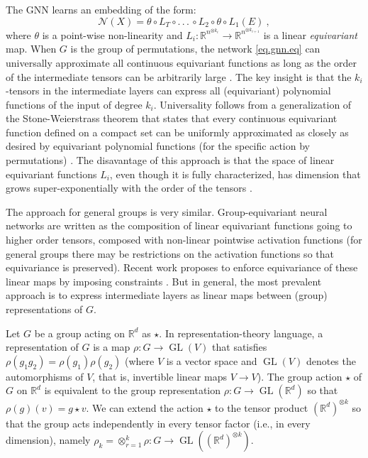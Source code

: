 \documentclass{article}
\theoremstyle{Hogg}
\renewcommand{\ldots}{.\,.\,}
\begin{document}
The GNN learns an embedding of the form:
\begin{equation}
    \label{eq.gnn.eq}
\mathcal{N}(  X)= \theta \circ   L_T \circ \ldots.\, \circ   L_2 \circ \theta \circ   L_1 (  E)~,
\end{equation}
where $\theta$ is a point-wise non-linearity and $  L_i: \mathbb R^{n^{\otimes k_i}}\to \mathbb R^{n^{\otimes k_{i+1}}}$ is a linear \emph{equivariant} map.
When $G$ is the group of permutations, the network \eqref{eq.gnn.eq} can universally approximate all continuous equivariant functions as long as the order of the intermediate tensors can be arbitrarily large \cite{maron2019universality, keriven2019universal}. The key insight is that the $k_i$-tensors in the intermediate layers can express all (equivariant) polynomial functions of the input of degree $k_i$.
Universality follows from a generalization of the Stone-Weierstrass theorem that states that every continuous equivariant function defined on a compact set can be uniformly approximated as closely as desired by equivariant polynomial functions (for the specific action by permutations) \cite{keriven2019universal, azizian2020characterizing}.
The disavantage of this approach is that the space of linear equivariant functions $  L_i$, even though it is fully characterized, has dimension that grows super-exponentially with the order of the tensors \cite{maron2018invariant}. 

The approach for general groups is very similar.
Group-equivariant neural networks are written as the composition of linear equivariant functions going to higher order tensors, composed with non-linear pointwise activation functions (for general groups there may be restrictions on the activation functions so that equivariance is preserved).
Recent work proposes to enforce equivariance of these linear maps by imposing constraints \cite{finzi2021practical}.
But in general, the most prevalent approach is to express
intermediate layers as linear maps between (group) representations of $G$. 

Let $G$ be a group acting on $\mathbb R^d$ as $\star$.
In representation-theory language, a representation of $G$ is a map $\rho: G\to \operatorname{GL}(V)$  that satisfies $\rho(g_1g_2)=\rho(g_1)\rho(g_2)$ (where $V$ is a vector space and $\operatorname{GL}(V)$ denotes the automorphisms of $V$, that is, invertible linear maps $V\to V$).
The group action $\star$ of $G$ on $\mathbb R^d$  is equivalent to the group representation $\rho: G \to \operatorname{GL}(\mathbb R^d)$ so that $\rho(g)(v)=g\star v$.
We can extend the action $\star$ to the tensor product $(\mathbb R^d)^{\otimes k}$ so that the group acts independently in every tensor factor (i.e., in every dimension), namely $\rho_k = \otimes_{r=1}^{k} \rho: G \to \operatorname{GL}((\mathbb R^d)^{\otimes k})$. 
\end{document}
